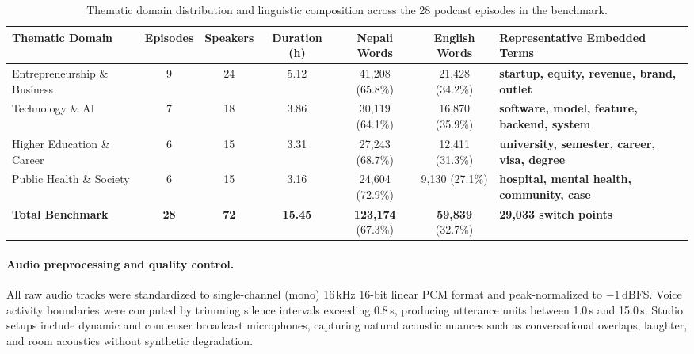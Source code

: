 \documentclass[10pt,twocolumn,a4paper]{article}
\begin{document}
\begin{table}[H]
\centering
\small
\setlength{\tabcolsep}{3.5pt}
\renewcommand{\arraystretch}{1.06}
\caption{Thematic domain distribution and linguistic composition across the 28 podcast episodes in the benchmark.}
\label{tab:datasheet_breakdown}
\begin{tabularx}{\textwidth}{@{} >{\raggedright\arraybackslash}p{4.2cm} ccccc >{\raggedright\arraybackslash}X@{}}
\toprule
\textbf{Thematic Domain} & \textbf{Episodes} & \textbf{Speakers} & \textbf{Duration (h)} & \textbf{Nepali Words} & \textbf{English Words} & \textbf{Representative Embedded Terms} \\
\midrule
Entrepreneurship \& Business & 9  & 24 & 5.12 & 41,208 (65.8\%) & 21,428 (34.2\%) & \textbf{startup, equity, revenue, brand, outlet} \\
Technology \& AI             & 7  & 18 & 3.86 & 30,119 (64.1\%) & 16,870 (35.9\%) & \textbf{software, model, feature, backend, system} \\
Higher Education \& Career   & 6  & 15 & 3.31 & 27,243 (68.7\%) & 12,411 (31.3\%) & \textbf{university, semester, career, visa, degree} \\
Public Health \& Society     & 6  & 15 & 3.16 & 24,604 (72.9\%) & 9,130 (27.1\%)  & \textbf{hospital, mental health, community, case} \\
\midrule
\textbf{Total Benchmark}     & \textbf{28} & \textbf{72} & \textbf{15.45} & \textbf{123,174} (67.3\%) & \textbf{59,839} (32.7\%) & \textbf{29,033 switch points} \\
\bottomrule
\end{tabularx}
\end{table}

\paragraph{Audio preprocessing and quality control.}
All raw audio tracks were standardized to single-channel (mono) 16\,kHz 16-bit linear PCM format and peak-normalized to $-1$\,dBFS. Voice activity boundaries were computed by trimming silence intervals exceeding 0.8\,s, producing utterance units between 1.0\,s and 15.0\,s. Studio setups include dynamic and condenser broadcast microphones, capturing natural acoustic nuances such as conversational overlaps, laughter, and room acoustics without synthetic degradation.
\end{document}
